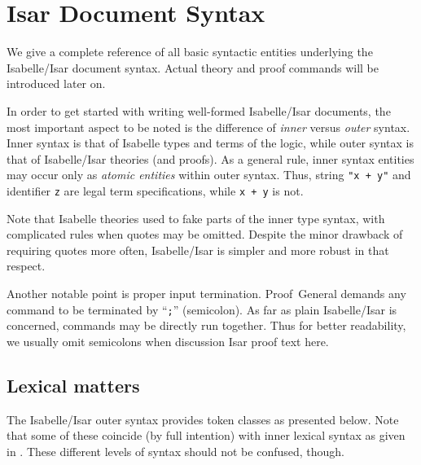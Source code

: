 
\chapter{Isar Document Syntax}

We give a complete reference of all basic syntactic entities underlying the
Isabelle/Isar document syntax.  Actual theory and proof commands will be
introduced later on.

\medskip

In order to get started with writing well-formed Isabelle/Isar documents, the
most important aspect to be noted is the difference of \emph{inner} versus
\emph{outer} syntax.  Inner syntax is that of Isabelle types and terms of the
logic, while outer syntax is that of Isabelle/Isar theories (and proofs).  As
a general rule, inner syntax entities may occur only as \emph{atomic entities}
within outer syntax.  Thus, string \texttt{"x + y"} and identifier \texttt{z}
are legal term specifications, while \texttt{x + y} is not.

\begin{warn}
  Note that Isabelle theories used to fake parts of the inner type syntax,
  with complicated rules when quotes may be omitted.  Despite the minor
  drawback of requiring quotes more often, Isabelle/Isar is simpler and more
  robust in that respect.
\end{warn}

\medskip

Another notable point is proper input termination.  Proof~General demands any
command to be terminated by ``\texttt{;}''
(semicolon)\index{*;}.  As far as plain Isabelle/Isar is
concerned, commands may be directly run together.  Thus for better
readability, we usually omit semicolons when discussion Isar proof text here.


\section{Lexical matters}\label{sec:lex-syntax}

The Isabelle/Isar outer syntax provides token classes as presented below.
Note that some of these coincide (by full intention) with inner lexical syntax
as given in \cite{isabelle-ref}.  These different levels of syntax should not
be confused, though.

